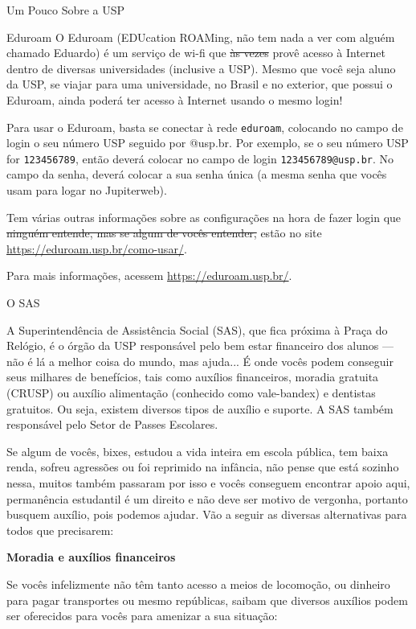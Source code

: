\begin{secao}{Um Pouco Sobre a USP}
\begin{subsecao}{Eduroam}
O Eduroam (EDUcation ROAMing, não tem nada a ver com alguém chamado Eduardo) é um
serviço de wi-fi que \sout{às vezes} provê acesso à Internet dentro de diversas
universidades (inclusive a USP). Mesmo que você seja aluno da USP, se viajar para
uma universidade, no Brasil e no exterior, que possui o Eduroam, ainda poderá ter
acesso à Internet usando o mesmo login!

Para usar o Eduroam, basta se conectar à rede \texttt{eduroam}, colocando no campo
de login o seu número USP seguido por @usp.br. Por exemplo, se o seu número USP for
\texttt{123456789}, então deverá colocar no campo de login \texttt{123456789@usp.br}.
No campo da senha, deverá colocar a sua senha única (a mesma senha que vocês usam
para logar no Jupiterweb).

Tem várias outras informações sobre as configurações na hora de fazer login que
\sout{ninguém entende, mas se algum de vocês entender,} estão no site
\url{https://eduroam.usp.br/como-usar/}.

Para mais informações, acessem \url{https://eduroam.usp.br/}.

\end{subsecao}

\begin{subsecao}{O SAS}

A Superintendência de Assistência Social (SAS), que fica próxima à Praça do
Relógio, é o órgão da USP responsável pelo bem estar financeiro dos alunos — não
é lá a melhor coisa do mundo, mas ajuda... É onde vocês podem conseguir seus
milhares de benefícios, tais como auxílios financeiros, moradia gratuita (CRUSP)
ou auxílio alimentação (conhecido como vale-bandex) e dentistas gratuitos. Ou
seja, existem diversos tipos de auxílio e suporte. A SAS também responsável pelo
Setor de Passes Escolares.

Se algum de vocês, bixes, estudou a vida inteira em escola pública, tem baixa renda,
sofreu agressões ou foi reprimido na infância, não pense que está sozinho nessa,
muitos também passaram por isso e vocês conseguem encontrar apoio aqui, permanência
estudantil é um direito e não deve ser motivo de vergonha, portanto busquem
auxílio, pois podemos ajudar. Vão a seguir as diversas alternativas para todos 
que precisarem:

{\bf Moradia e auxílios financeiros}

Se vocês infelizmente não têm tanto acesso a meios de locomoção, ou dinheiro para
pagar transportes ou mesmo repúblicas, saibam que diversos auxílios podem ser
oferecidos para vocês para amenizar a sua situação:


\end{subsecao}
\end{secao}
